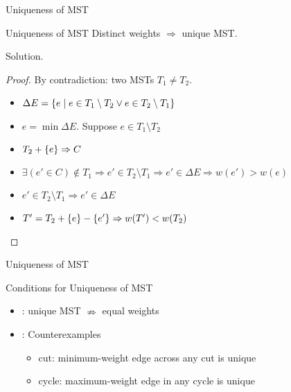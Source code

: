 \begin{frame}{Uniqueness of MST}
  \begin{exampleblock}{Uniqueness of MST }
    Distinct weights $\Rightarrow$ unique MST.
  \end{exampleblock}

  \begin{block}{Solution.}
    \begin{proof}
      By contradiction: two MSTs $T_1 \neq T_2$.
      \begin{itemize}
	\item $\Delta E = \{e \mid e \in T_1 \setminus T_2 \lor e \in T_2
	  \setminus T_1\}$
	\item $e = \min \Delta E$. Suppose $e \in T_1 \setminus T_2$
	\item $T_2 + \{e\} \Rightarrow C$
	\item $\exists (e' \in C) \notin T_1 \Rightarrow e' \in T_{2} \setminus T_{1} \Rightarrow e' \in \Delta E \Rightarrow w(e') > w(e)$
	\item $e' \in T_{2} \setminus T_{1} \Rightarrow e' \in \Delta E$
	\item $T' = T_{2} + \{e\} - \{e'\} \Rightarrow w(T') < w(T_{2})$
      \end{itemize}
    \end{proof}
  \end{block}
\end{frame}
\begin{frame}{Uniqueness of MST}
  \begin{block}{Conditions for Uniqueness of MST }
    \begin{itemize}
      \item {}: unique MST $\nRightarrow$ equal weights
      \item {}: Counterexamples
        \begin{itemize}
          \item \xmark cut: minimum-weight edge across any cut is unique
          \item \xmark cycle: maximum-weight edge in any cycle is unique
        \end{itemize}
        \begin{columns}
        \end{columns}
    \end{itemize}
  \end{block}
\end{frame}

